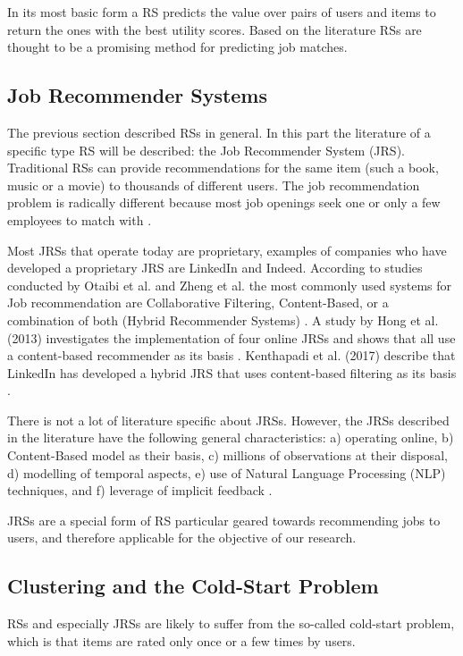 In its most basic form a RS predicts the value over pairs of users and items to return the ones with the best utility scores.
Based on the literature RSs are thought to be a promising method for predicting job matches.

\subsection{Job Recommender Systems}
\label{sec:jrs}
The previous section described RSs in general. 
In this part the literature of a specific type RS will be described: the Job Recommender System (JRS).
Traditional RSs can provide recommendations for the same item (such a book, music or a movie) to thousands of different users.
The job recommendation problem is radically different because most job openings seek one or only a few employees to match with \cite{kenthapadi2017personalized}.

Most JRSs that operate today are proprietary, examples of companies who have developed a proprietary JRS are LinkedIn and Indeed.
According to studies conducted by Otaibi et al. and Zheng et al. the most commonly used  systems for Job recommendation are Collaborative Filtering, Content-Based, or a combination of both (Hybrid Recommender Systems) \cite{T.Al-Otaibi2012ASystems, Zheng2012JobSurvey}.
A study by Hong et al. (2013) investigates the implementation of four online JRSs and shows that all use a content-based recommender as its basis \cite{hong2013job}.
Kenthapadi et al. (2017) describe that LinkedIn has developed a hybrid JRS that uses content-based filtering as its basis \cite{kenthapadi2017personalized}.

There is not a lot of literature specific about JRSs. 
However, the JRSs described in the literature have the following general characteristics: a) operating online, b) Content-Based model as their basis, c) millions of observations at their disposal, d) modelling of temporal aspects, e) use of Natural Language Processing (NLP) techniques, and f) leverage of implicit feedback \cite{kenthapadi2017personalized, T.Al-Otaibi2012ASystems, Zheng2012JobSurvey, hong2013job}.

JRSs are a special form of RS particular geared towards recommending jobs to users, and therefore applicable for the objective of our research.

\subsection{Clustering and the Cold-Start Problem}
\label{sec:ccs}
RSs and especially JRSs are likely to suffer from the so-called cold-start problem, which is that items are rated only once or a few times by users.

